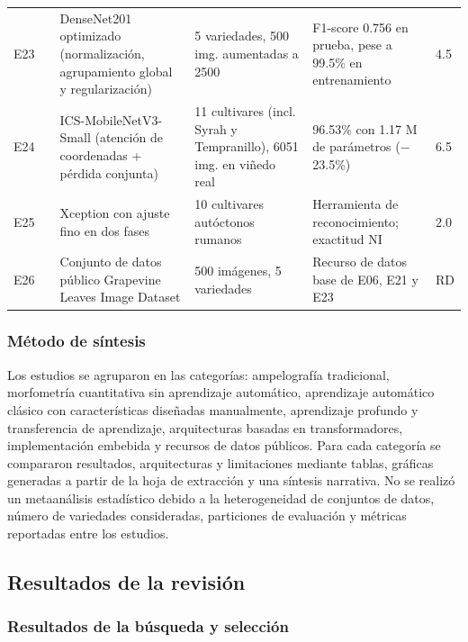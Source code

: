 \begin{longtable}{L{0.7cm}L{2.5cm}L{3.3cm}L{2.6cm}L{2.4cm}L{0.6cm}}
E23 & \citet{huang2025} & DenseNet201 optimizado (normalización, agrupamiento global y regularización) & 5 variedades, 500 img. aumentadas a 2500 & F1-score 0.756 en prueba, pese a 99.5\% en entrenamiento & 4.5 \\
E24 & \citet{deng2025} & ICS-MobileNetV3-Small (atención de coordenadas + pérdida conjunta) & 11 cultivares (incl. Syrah y Tempranillo), 6051 img. en viñedo real & 96.53\% con 1.17 M de parámetros ($-$23.5\%) & 6.5 \\
E25 & \citet{colibaba2026} & Xception con ajuste fino en dos fases & 10 cultivares autóctonos rumanos & Herramienta de reconocimiento; exactitud NI & 2.0 \\
E26 & \citet{koklu2022dataset} & Conjunto de datos público Grapevine Leaves Image Dataset & 500 imágenes, 5 variedades & Recurso de datos base de E06, E21 y E23 & RD \\
\end{longtable}

\subsubsection{Método de síntesis}

Los estudios se agruparon en las categorías: ampelografía tradicional,
morfometría cuantitativa sin aprendizaje automático, aprendizaje automático
clásico con características diseñadas manualmente, aprendizaje profundo y
transferencia de aprendizaje, arquitecturas basadas en transformadores,
implementación embebida y recursos de datos públicos. Para cada categoría se
compararon resultados, arquitecturas y limitaciones mediante tablas, gráficas
generadas a partir de la hoja de extracción y una síntesis narrativa. No se
realizó un metaanálisis estadístico debido a la heterogeneidad de conjuntos de
datos, número de variedades consideradas, particiones de evaluación y
métricas reportadas entre los estudios.

\subsection{Resultados de la revisión}

\subsubsection{Resultados de la búsqueda y selección}

